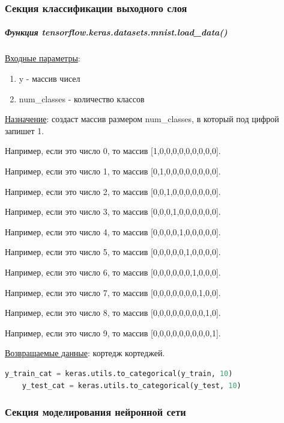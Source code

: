 \subsubsection*{Секция классификации выходного слоя}

\subparagraph{Функция tensorflow.keras.datasets.mnist.load\_data()} \hspace{0pt}

\underline{Входные параметры}:

\begin{enumerate}
    \item y - массив чисел
    \item num\_classes - количество классов
\end{enumerate}

\underline{Назначение}: создаст массив размером num\_classes, в который под цифрой запишет 1.

Например, если это число 0, то массив [1,0,0,0,0,0,0,0,0,0].

Например, если это число 1, то массив [0,1,0,0,0,0,0,0,0,0].

Например, если это число 2, то массив [0,0,1,0,0,0,0,0,0,0].

Например, если это число 3, то массив [0,0,0,1,0,0,0,0,0,0].

Например, если это число 4, то массив [0,0,0,0,1,0,0,0,0,0].

Например, если это число 5, то массив [0,0,0,0,0,1,0,0,0,0].

Например, если это число 6, то массив [0,0,0,0,0,0,1,0,0,0].

Например, если это число 7, то массив [0,0,0,0,0,0,0,1,0,0].

Например, если это число 8, то массив [0,0,0,0,0,0,0,0,1,0].

Например, если это число 9, то массив [0,0,0,0,0,0,0,0,0,1].

\underline{Возвращаемые данные}: кортедж кортеджей.

\begin{lstlisting}[language=Python,]
    y_train_cat = keras.utils.to_categorical(y_train, 10)
    y_test_cat = keras.utils.to_categorical(y_test, 10)
\end{lstlisting}



\subsubsection*{Секция моделирования нейронной сети}


